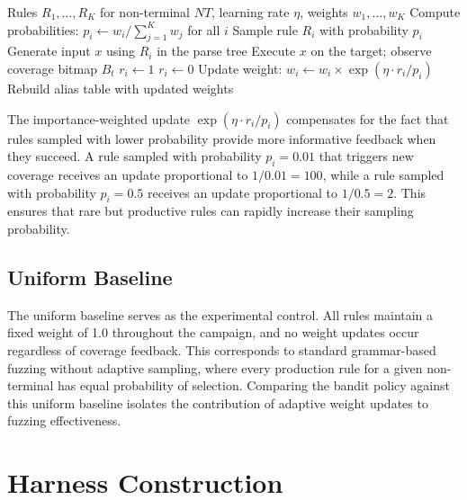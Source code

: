 \begin{algorithm}[htbp]
\caption{Bandit Weight Update for Grammar Rule Selection}
\label{alg:bandit-update}
\begin{algorithmic}[1]
\Require Rules $R_1, \ldots, R_K$ for non-terminal $NT$, learning rate $\eta$, weights $w_1, \ldots, w_K$
    \State Compute probabilities: $p_i \gets w_i / \sum_{j=1}^{K} w_j$ for all $i$
    \State Sample rule $R_i$ with probability $p_i$
    \State Generate input $x$ using $R_i$ in the parse tree
    \State Execute $x$ on the target; observe coverage bitmap $B_t$
        \State $r_i \gets 1$ 
    \Else
        \State $r_i \gets 0$ 
    \EndIf
    \State Update weight: $w_i \gets w_i \times \exp\left(\eta \cdot r_i / p_i\right)$
    \State Rebuild alias table with updated weights
\EndFor
\end{algorithmic}
\end{algorithm}

The importance-weighted update $\exp(\eta \cdot r_i / p_i)$ compensates for the fact that rules sampled with lower probability provide more informative feedback when they succeed. A rule sampled with probability $p_i = 0.01$ that triggers new coverage receives an update proportional to $1/0.01 = 100$, while a rule sampled with probability $p_i = 0.5$ receives an update proportional to $1/0.5 = 2$. This ensures that rare but productive rules can rapidly increase their sampling probability.

\subsection{Uniform Baseline}

The uniform baseline serves as the experimental control. All rules maintain a fixed weight of 1.0 throughout the campaign, and no weight updates occur regardless of coverage feedback. This corresponds to standard grammar-based fuzzing without adaptive sampling, where every production rule for a given non-terminal has equal probability of selection. Comparing the bandit policy against this uniform baseline isolates the contribution of adaptive weight updates to fuzzing effectiveness.

\section{Harness Construction}
\label{sec:harness}

